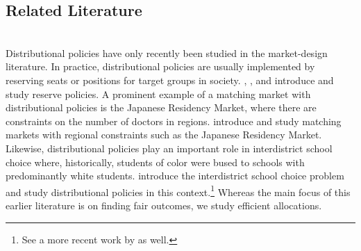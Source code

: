 \documentclass[12pt]{amsart}
\theoremstyle{remark}
\begin{document}
\subsection*{Related Literature}\hfill\\
Distributional policies have only recently been studied in the market-design literature. In practice, distributional policies are usually implemented
by reserving seats or positions for target groups in society. \cite{hayeyi13}, \cite{ehayeyi14}, and \cite{echyen12} introduce and study
reserve policies. A prominent example of a matching market with distributional policies is the Japanese Residency Market, where there are constraints on the number
of doctors in regions. \cite{kamakoji-basic,kamakoji-concepts,kamada2018stability,kamada2020accommodating} introduce and study matching markets with
regional constraints such as the Japanese Residency Market. Likewise, distributional policies play an
important role in interdistrict school choice where, historically, students of color
were bused to schools with predominantly white students. \cite{hafalir2022interdistrict} introduce the interdistrict school choice problem and
study distributional policies in this context.\footnote{See a more recent work by \cite{kamada2022ekkyo} as well.} Whereas the main focus of this earlier literature is on finding fair outcomes, we study efficient allocations.


\end{document}
